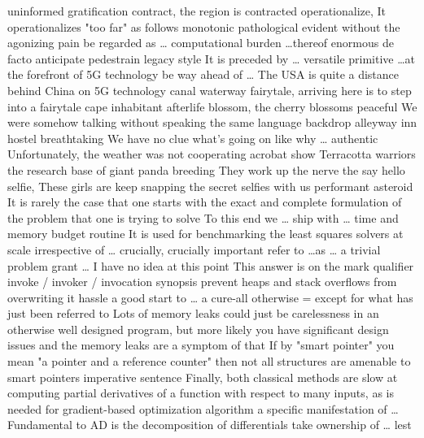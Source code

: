 \documentclass[12pt]{article}
\begin{document}
uninformed 
gratification 
contract, the region is contracted 
operationalize, It operationalizes "too far" as follows 
monotonic 
pathological 
evident 
without the agonizing pain 
be regarded as \dots 
computational burden 
\dots thereof 
enormous 
de facto 
anticipate 
pedestrain 
legacy style 
It is preceded by \dots 
versatile 
primitive 
\dots at the forefront of 5G technology 
be way ahead of \dots 
The USA is quite a distance behind China on 5G technology 
canal 
waterway 
fairytale, arriving here is to step into a fairytale 
cape 
inhabitant 
afterlife 
blossom, the cherry blossoms 
peaceful 
We were somehow talking without speaking the same language 
backdrop 
alleyway 
inn 
hostel 
breathtaking 
We have no clue what's going on like why \dots 
authentic 
Unfortunately, the weather was not cooperating 
acrobat show 
Terracotta warriors 
the research base of giant panda breeding 
They work up the nerve the say hello 
selfie, These girls are keep snapping the secret selfies with us 
performant 
asteroid 
It is rarely the case that one starts with the exact and complete formulation of the problem that one is trying to solve
To this end we \dots 
ship with \dots 
time and memory budget 
routine 
It is used for benchmarking the least squares solvers 
at scale 
irrespective of \dots 
crucially, crucially important 
refer to \dots as \dots 
a trivial problem 
grant \dots 
I have no idea at this point 
This answer is on the mark 
qualifier 
invoke / invoker / invocation 
synopsis 
prevent heaps and stack overflows from overwriting it 
hassle 
a good start to \dots 
a cure-all 
otherwise = except for what has just been referred to 
Lots of memory leaks could just be carelessness in an otherwise well designed program, but more likely you have significant design issues and the memory leaks are a symptom of that 
If by "smart pointer" you mean "a pointer and a reference counter" then not all structures are amenable to smart pointers
imperative sentence 
Finally, both classical methods are slow at computing partial derivatives of a function with respect to many inputs, as is needed for gradient-based optimization algorithm 
a specific manifestation of \dots 
Fundamental to AD is the decomposition of differentials 
take ownership of \dots 
lest 
\end{document}
